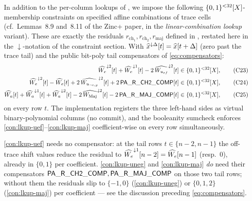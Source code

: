 In addition to the per-column lookups of , we
impose the following $\{0,1\}^{<32}[X]$-membership constraints on
specified affine combinations of trace cells (cf.\ Lemmas~8.9
and~8.11 of the Zinc+ paper, in the \emph{linear-combination lookup}
variant). These are exactly the residuals
$r_{\mathrm{ch}_1}, r_{\mathrm{ch}_2}, r_{\mathrm{maj}}$ defined in
, restated here in the $\downarrow$-notation of the
constraint section. With $\widehat{x}^{\downarrow\Delta}[t] = \widehat{x}[t+\Delta]$
(zero past the trace tail) and the public bit-poly tail compensators
of \eqref{eq:compensators}:
\begin{align}
\widehat{W_e}^{\downarrow 2}[t] + \widehat{W_e}^{\downarrow 1}[t] - 2\,\widehat{W_{u_{ef}}}^{\downarrow 2}[t] &\in \{0,1\}^{<32}[X], \tag{C23}\label{con:lkup-uef}\\
\widehat{W_e}^{\downarrow 2}[t] - \widehat{W_e}[t] + 2\,\widehat{W_{u_{\neg e,g}}}^{\downarrow 2}[t] + 2\,\mathsf{PA\_R\_CH2\_COMP}[t] &\in \{0,1\}^{<32}[X], \tag{C24}\label{con:lkup-uneg}\\
\widehat{W_a}[t] + \widehat{W_a}^{\downarrow 1}[t] + \widehat{W_a}^{\downarrow 2}[t] - 2\,\widehat{W_{\operatorname{Maj}}}^{\downarrow 2}[t] - 2\,\mathsf{PA\_R\_MAJ\_COMP}[t] &\in \{0,1\}^{<32}[X], \tag{C25}\label{con:lkup-maj}
\end{align}
on every row $t$. The implementation registers the three left-hand
sides as virtual binary-polynomial columns (no commit), and the
booleanity sumcheck enforces \ref{con:lkup-uef}--\ref{con:lkup-maj}
coefficient-wise on every row simultaneously.

\ref{con:lkup-uef} needs no compensator: at the tail rows
$t \in \{n-2, n-1\}$ the off-trace shift values reduce the residual
to $\widehat{W_e}^{\downarrow 1}[n-2] = \widehat{W_e}[n-1]$ (resp.\ $0$),
already in $\{0,1\}$ per coefficient. \ref{con:lkup-uneg} and
\ref{con:lkup-maj} \emph{do} need their compensators
$\mathsf{PA\_R\_CH2\_COMP}, \mathsf{PA\_R\_MAJ\_COMP}$ on those two tail
rows; without them the residuals slip to $\{-1, 0\}$
(\ref{con:lkup-uneg}) or $\{0, 1, 2\}$ (\ref{con:lkup-maj}) per
coefficient — see the discussion preceding \eqref{eq:compensators}.

